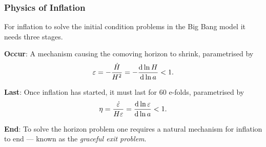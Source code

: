 \subsubsection{Physics of Inflation}

For inflation to solve the initial condition problems in the Big Bang model it needs three stages.

\begin{hangparas}{24pt}{1}
	\textbf{Occur}:
	A mechanism causing the comoving horizon to shrink, parametrised by
	\begin{equation}
		\varepsilon
		= -\frac{\dot{H}}{H^{2}}
		= -\dv{\ln{H}}{\ln{a}}
		< 1.
	\end{equation}

	\textbf{Last}:
	Once inflation has started, it must last for 60 e-folds, parametrised by
	\begin{equation}
		\eta
		= \frac{\dot{\varepsilon}}{H\varepsilon}
		= \dv{\ln{\varepsilon}}{\ln{a}}
		< 1.
	\end{equation}

	\textbf{End}:
	To solve the horizon problem one requires a natural mechanism for inflation to end --- known as the \emph{graceful exit problem}.
\end{hangparas}

